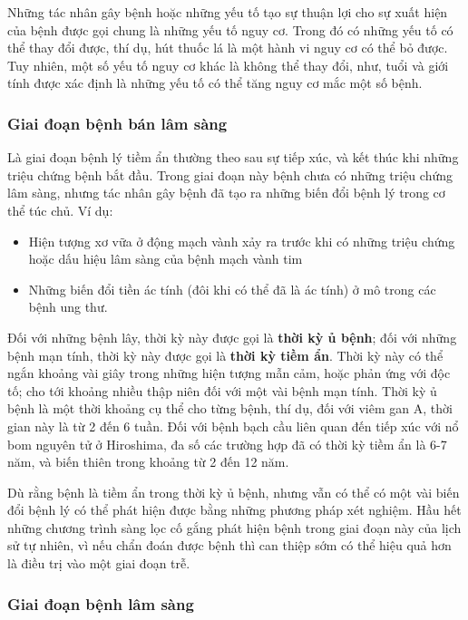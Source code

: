 \documentclass[
]{book}
\providecommand{\tightlist}{%
  \setlength{\itemsep}{0pt}\setlength{\parskip}{0pt}}
\begin{document}
Những tác nhân gây bệnh hoặc những yếu tố tạo sự thuận lợi cho sự xuất hiện của bệnh được gọi chung là những yếu tố nguy cơ. Trong đó có những yếu tố có thể thay đổi được, thí dụ, hút thuốc lá là một hành vi nguy cơ có thể bỏ được. Tuy nhiên, một số yếu tố nguy cơ khác là không thể thay đổi, như, tuổi và giới tính được xác định là những yếu tố có thể tăng nguy cơ mắc một số bệnh.

\hypertarget{giai-ux111oux1ea1n-bux1ec7nh-buxe1n-luxe2m-suxe0ng}{%
\subsubsection{Giai đoạn bệnh bán lâm sàng}\label{giai-ux111oux1ea1n-bux1ec7nh-buxe1n-luxe2m-suxe0ng}}

Là giai đoạn bệnh lý tiềm ẩn thường theo sau sự tiếp xúc, và kết thúc khi những triệu chứng bệnh bắt đầu. Trong giai đoạn này bệnh chưa có những triệu chứng lâm sàng, nhưng tác nhân gây bệnh đã tạo ra những biến đổi bệnh lý trong cơ thể túc chủ. Ví dụ:

\begin{itemize}
\tightlist
\item
  Hiện tượng xơ vữa ở động mạch vành xảy ra trước khi có những triệu chứng hoặc dấu hiệu lâm sàng của bệnh mạch vành tim
\item
  Những biến đổi tiền ác tính (đôi khi có thể đã là ác tính) ở mô trong các bệnh ung thư.
\end{itemize}

Đối với những bệnh lây, thời kỳ này được gọi là \textbf{thời kỳ ủ bệnh}; đối với những bệnh mạn tính, thời kỳ này được gọi là \textbf{thời kỳ tiềm ẩn}. Thời kỳ này có thể ngắn khoảng vài giây trong những hiện tượng mẫn cảm, hoặc phản ứng với độc tố; cho tới khoảng nhiều thập niên đối với một vài bệnh mạn tính. Thời kỳ ủ bệnh là một thời khoảng cụ thể cho từng bệnh, thí dụ, đối với viêm gan A, thời gian này là từ 2 đến 6 tuần. Đối với bệnh bạch cầu liên quan đến tiếp xúc với nổ bom nguyên tử ở Hiroshima, đa số các trường hợp đã có thời kỳ tiềm ẩn là 6-7 năm, và biến thiên trong khoảng từ 2 đến 12 năm.

Dù rằng bệnh là tiềm ẩn trong thời kỳ ủ bệnh, nhưng vẫn có thể có một vài biến đổi bệnh lý có thể phát hiện được bằng những phương pháp xét nghiệm. Hầu hết những chương trình sàng lọc cố gắng phát hiện bệnh trong giai đoạn này của lịch sử tự nhiên, vì nếu chẩn đoán được bệnh thì can thiệp sớm có thể hiệu quả hơn là điều trị vào một giai đoạn trễ.

\hypertarget{giai-ux111oux1ea1n-bux1ec7nh-luxe2m-suxe0ng}{%
\subsubsection{Giai đoạn bệnh lâm sàng}\label{giai-ux111oux1ea1n-bux1ec7nh-luxe2m-suxe0ng}}
\end{document}

